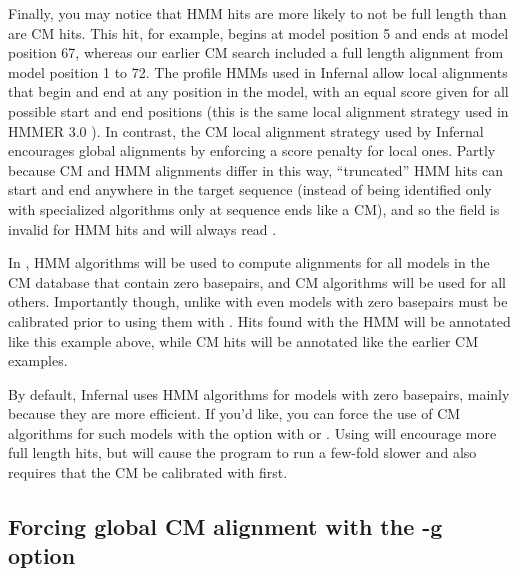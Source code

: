 Finally, you may notice that HMM hits are more likely to not be full
length than are CM hits. This hit, for example, begins at model
position 5 and ends at model position 67, whereas our earlier CM
search included a full length alignment from model position 1 to
72. The profile HMMs used in Infernal allow local alignments that
begin and end at any position in the model, with an equal score given
for all possible start and end positions (this is the same local
alignment strategy used in HMMER 3.0 \cite{Eddy08}). In contrast, the
CM local alignment strategy used by Infernal encourages global
alignments by enforcing a score penalty for local ones. Partly because
CM and HMM alignments differ in this way, ``truncated'' HMM hits can
start and end anywhere in the target sequence (instead of being
identified only with specialized algorithms only at sequence ends like
a CM), and so the  field is invalid for HMM hits and will
always read \ccode{-}.

In , HMM algorithms will be used to compute alignments
for all models in the CM database that contain zero basepairs, and CM
algorithms will be used for all others. Importantly though, unlike with
 even models with zero basepairs must be calibrated
prior to using them with . Hits found with the HMM will
be annotated like this example above, while CM hits will be annotated
like the earlier CM examples.

By default, Infernal uses HMM algorithms for models with zero
basepairs, mainly because they are more efficient. If you'd like, you
can force the use of CM algorithms for such models with the
 option with  or . Using
 will encourage more full length hits, but will
cause the program to run a few-fold slower and also requires that the
CM be calibrated with  first.


\subsection{Forcing global CM alignment with the -g option}

